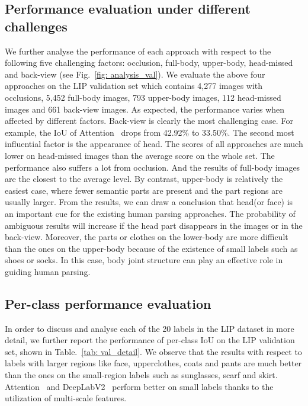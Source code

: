 \documentclass[10pt,twocolumn,letterpaper]{article}
\begin{document}
\subsection{Performance evaluation under different challenges}
We further analyse the performance of each approach with respect to the following five challenging factors: occlusion, full-body, upper-body, head-missed and back-view (see Fig.~\ref{fig: analysis_val}). We evaluate the above four approaches on the LIP validation set which contains 4,277 images with occlusions, 5,452 full-body images, 793 upper-body images, 112 head-missed images and 661 back-view images. As expected, the performance varies when affected by different factors. Back-view is clearly the most challenging case. For example, the IoU of Attention~\cite{chen2015attention} drops from 42.92\% to 33.50\%. The second most influential factor is the appearance of head. The scores of all approaches are much lower on head-missed images than the average score on the whole set. The performance also suffers a lot from occlusion. And the results of full-body images are the closest to the average level. By contrast, upper-body is relatively the easiest case, where fewer semantic parts are present and the part regions are usually larger. From the results, we can draw a conclusion that head(or face) is an important cue for the existing human parsing approaches. The probability of ambiguous results will increase if the head part disappears in the images or in the back-view. Moreover, the parts or clothes on the lower-body are more difficult than the ones on the upper-body because of the existence of small labels such as shoes or socks. In this case, body joint structure can play an effective role in guiding human parsing.
\subsection{Per-class performance evaluation}
In order to discuss and analyse each of the 20 labels in the LIP dataset in more detail, we further report the performance of per-class IoU on the LIP validation set, shown in Table.~\ref{tab: val_detail}. We observe that the results with respect to labels with larger regions like face, upperclothes, coats and pants are much better than the ones on the small-region labels such as sunglasses, scarf and skirt. Attention~\cite{chen2015attention} and DeepLabV2~\cite{chen2014semantic} perform better on small labels thanks to the utilization of multi-scale features.
\end{document}
